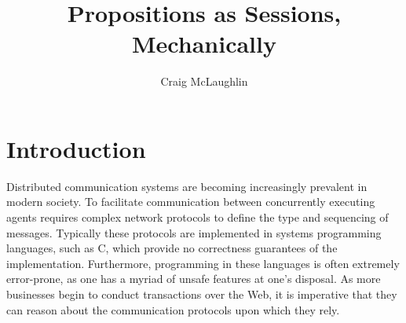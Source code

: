 \documentclass{mpaper}
\begin{document}
\title{Propositions as Sessions, Mechanically}
\author{Craig McLaughlin}

\maketitle

\begin{abstract}
\begin{comment}
SPL (+CPL)

WTD

ROF

IMP
\end{comment}
\end{abstract}

\begin{comment}
\section{Issues}

\begin{itemize}
\item What is required of a Metatheory library for linear type systems?
  Permutation reasoning? Weakening/Contraction for non-linear components?
\item Discuss the different approaches that were taken to maintain close
  correspondence with the paper presentation
\item Make sure to note that the paper leaves details (a lot of the ``cruft'')
  out of the proofs e.g. where weakening is applied in the typing derivations
\item Mention the use of Metatheory and its limitations when mechanising
  linear type systems like GV/CP
\end{itemize}
\end{comment}

\section{Introduction}\label{sec:intro}

Distributed communication systems are becoming increasingly prevalent in
modern society. To facilitate communication between concurrently executing
agents requires complex network protocols to define the type and sequencing of
messages. Typically these protocols are implemented in systems programming
languages, such as C, which provide no correctness guarantees of the
implementation. Furthermore, programming in these languages is often extremely
error-prone, as one has a myriad of unsafe features at one's disposal. As more
businesses begin to conduct transactions over the Web, it is imperative that
they can reason about the communication protocols upon which they rely.
\end{document}
